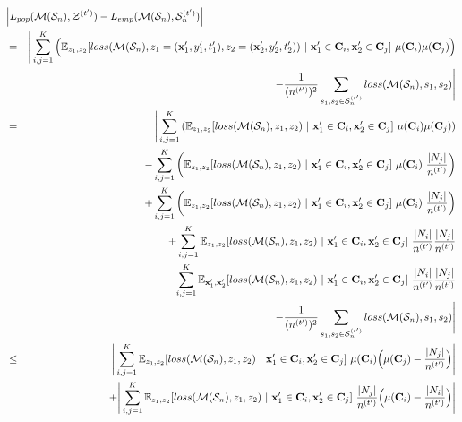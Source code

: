 {\allowdisplaybreaks
\begin{eqnarray*}
\lefteqn{
        \Big| L_{pop}(\mathcal{M}(\mathcal{S}_n),\mathcal{Z}^{(t')}) - L_{emp}(\mathcal{M}(\mathcal{S}_n),\mathcal{S}_n^{(t')}) \Big| }\\
       & =& 
        \Bigg| \sum_{i,j=1}^{K} \Big( \mathbb{E}_{z_1,z_2}[loss(\mathcal{M}(\mathcal{S}_n),z_1=(\x'_1,y'_1,t'_1),z_2=(\x'_2,y'_2,t'_2))~|~\x'_1\in\mathbf{C}_i,\x'_2\in\mathbf{C}_j]~\mu(\mathbf{C}_i)\mu(\mathbf{C}_j) \Big)
        \\&&- 
        \frac{1}{(n^{(t')})^2}\sum_{s_1,s_2\in\mathcal{S}^{(t')}_n} loss(\mathcal{M}(\mathcal{S}_n),s_1,s_2)
        \Bigg|\\
        & =& 
        \Bigg| \sum_{i,j=1}^{K} \left( \mathbb{E}_{z_1,z_2}[loss(\mathcal{M}(\mathcal{S}_n),z_1,z_2)~|~\x'_1\in\mathbf{C}_i,\x'_2\in\mathbf{C}_j]~\mu(\mathbf{C}_i)\mu(\mathbf{C}_j) \right) \\&& - \sum_{i,j=1}^{K} \left(\mathbb{E}_{z_1,z_2}[loss(\mathcal{M}(\mathcal{S}_n),z_1,z_2)~|~\x'_1\in\mathbf{C}_i,\x'_2\in\mathbf{C}_j]~\mu(\mathbf{C}_i)~\frac{|N_j|}{n^{(t')}}\right)
        \\&&
        + \sum_{i,j=1}^{K} \left(\mathbb{E}_{z_1,z_2}[loss(\mathcal{M}(\mathcal{S}_n),z_1,z_2)~|~\x'_1\in\mathbf{C}_i,\x'_2\in\mathbf{C}_j]~\mu(\mathbf{C}_i)~\frac{|N_j|}{n^{(t')}}\right) \\&&+ \sum_{i,j=1}^{K} \mathbb{E}_{z_1,z_2}[loss(\mathcal{M}(\mathcal{S}_n),z_1,z_2)~|~\x'_1\in\mathbf{C}_i,\x'_2\in\mathbf{C}_j]~
        \frac{|N_i|}{n^{(t')}} \frac{|N_j|}{n^{(t')}} \\&&- \sum_{i,j=1}^{K} \mathbb{E}_{\x'_1,\x'_2}[loss(\mathcal{M}(\mathcal{S}_n),z_1,z_2)~|~\x'_1\in\mathbf{C}_i,\x'_2\in\mathbf{C}_j]~
        \frac{|N_i|}{n^{(t')}} \frac{|N_j|}{n^{(t')}}
        \\&&- 
        \frac{1}{(n^{(t')})^2}\sum_{s_1,s_2\in\mathcal{S}^{(t')}_n} loss(\mathcal{M}(\mathcal{S}_n),s_1,s_2)
        \Bigg|\\
        &\leq& \Bigg| \sum_{i,j=1}^{K} \mathbb{E}_{z_1,z_2}[loss(\mathcal{M}(\mathcal{S}_n),z_1,z_2)~|~\x'_1\in\mathbf{C}_i,\x'_2\in\mathbf{C}_j]~\mu(\mathbf{C}_i)\Big(\mu(\mathbf{C}_j) - \frac{|N_j|}{n^{(t')}}\Big) \Bigg|\\
        &&+\Bigg| \sum_{i,j=1}^{K} \mathbb{E}_{z_1,z_2}[loss(\mathcal{M}(\mathcal{S}_n),z_1,z_2)~|~\x'_1\in\mathbf{C}_i,\x'_2\in\mathbf{C}_j]~
        \frac{|N_j|}{n^{(t')}}
        \Big(\mu(\mathbf{C}_i) - \frac{|N_i|}{n^{(t')}}\Big) \Bigg|\\

\end{eqnarray*}}
